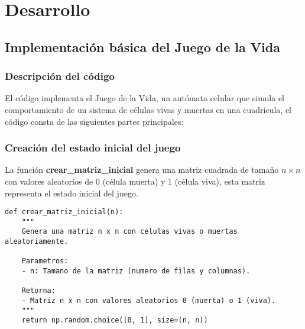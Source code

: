 \section{Desarrollo}
\subsection{Implementación básica del Juego de la Vida}
    
\subsubsection*{Descripción del código}

El código implementa el Juego de la Vida, un autómata celular que simula el comportamiento de 
un sistema de células vivas y muertas en una cuadrícula, el código consta de las siguientes 
partes principales:

\subsubsection*{Creación del estado inicial del juego}

La función \textbf{crear\_matriz\_inicial} genera una matriz cuadrada de tamaño $n \times n$ con 
valores aleatorios de 0 (célula muerta) y 1 (célula viva), esta matriz representa el estado 
inicial del juego.

\begin{lstlisting}
def crear_matriz_inicial(n):
    """
    Genera una matriz n x n con celulas vivas o muertas aleatoriamente.
    
    Parametros:
    - n: Tamano de la matriz (numero de filas y columnas).
    
    Retorna:
    - Matriz n x n con valores aleatorios 0 (muerta) o 1 (viva).
    """
    return np.random.choice([0, 1], size=(n, n))
\end{lstlisting}


